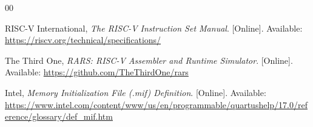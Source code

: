 \documentclass[conference]{IEEEtran}
\begin{document}
\begin{thebibliography}{00}

RISC-V International, \textit{The RISC-V Instruction Set Manual}. [Online]. Available: \url{https://riscv.org/technical/specifications/}

The Third One, \textit{RARS: RISC-V Assembler and Runtime Simulator}. [Online]. Available: \url{https://github.com/TheThirdOne/rars}

Intel, \textit{Memory Initialization File (.mif) Definition}. [Online]. Available: \url{https://www.intel.com/content/www/us/en/programmable/quartushelp/17.0/reference/glossary/def_mif.htm}

\end{thebibliography}
\end{document}
